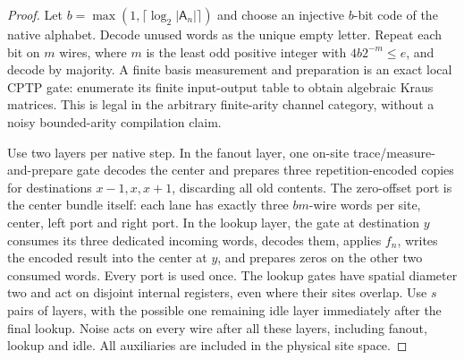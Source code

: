 \begin{proof}
Let $b=\max(1,\lceil\log_2|\mathsf A_n|\rceil)$ and choose an
injective $b$-bit code of the native alphabet. Decode unused words
as the unique empty letter. Repeat each bit on $m$ wires, where $m$
is the least odd positive integer with $4b2^{-m}\le e$, and decode
by majority. A finite basis measurement and preparation is an exact
local CPTP gate: enumerate its finite input-output table to obtain
algebraic Kraus matrices. This is legal in the arbitrary finite-arity
channel category, without a noisy bounded-arity compilation claim.

Use two layers per native step. In the fanout layer, one on-site
trace/measure-and-prepare gate decodes the center and prepares three
repetition-encoded copies for destinations $x-1,x,x+1$, discarding
all old contents. The zero-offset port is the center bundle itself:
each lane has exactly three $bm$-wire words per site, center, left
port and right port. In the lookup layer, the gate at destination
$y$ consumes its three dedicated incoming words, decodes them,
applies $f_n$, writes the encoded result into the center at $y$,
and prepares zeros on the other two consumed words. Every port is
used once. The lookup gates have spatial diameter two and act on
disjoint internal registers, even where their sites overlap.
Use $s$ pairs of layers, with the possible one remaining idle layer
immediately after the final lookup. Noise acts on every wire after
all these layers, including fanout, lookup and idle. All auxiliaries
are included in the physical site space.


\end{proof}
